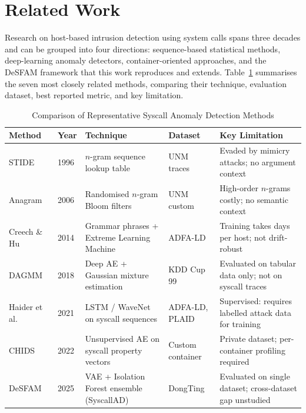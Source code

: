 \section{Related Work}
\label{sec:related}

Research on host-based intrusion detection using system calls spans three decades and can
be grouped into four directions: sequence-based statistical methods, deep-learning anomaly
detectors, container-oriented approaches, and the DeSFAM framework that this work reproduces
and extends. Table~\ref{tab:related_comparison} summarises the seven most closely related
methods, comparing their technique, evaluation dataset, best reported metric, and key
limitation.

\begin{table}[tp]
\centering
\caption{Comparison of Representative Syscall Anomaly Detection Methods}
\label{tab:related_comparison}
\renewcommand{\arraystretch}{1.15}
\begin{tabular}{@{}llllp{4.2cm}@{}}
\toprule
\textbf{Method} & \textbf{Year} & \textbf{Technique} & \textbf{Dataset} & \textbf{Key Limitation} \\
\midrule
STIDE~\cite{forrest1996sense}
  & 1996 & $n$-gram sequence lookup table
  & UNM traces
  & Evaded by mimicry attacks; no argument context \\

Anagram~\cite{wang2006anagram}
  & 2006 & Randomised $n$-gram Bloom filters
  & UNM custom
  & High-order $n$-grams costly; no semantic context \\

Creech \& Hu~\cite{creech2014semantic}
  & 2014 & Grammar phrases + Extreme Learning Machine
  & ADFA-LD
  & Training takes days per host; not drift-robust \\

DAGMM~\cite{zong2018dagmm}
  & 2018 & Deep AE + Gaussian mixture estimation
  & KDD Cup 99
  & Evaluated on tabular data only; not on syscall traces \\

Haider et al.~\cite{haider2021deep}
  & 2021 & LSTM / WaveNet on syscall sequences
  & ADFA-LD, PLAID
  & Supervised: requires labelled attack data for training \\

CHIDS~\cite{elkhairi2022chids}
  & 2022 & Unsupervised AE on syscall property vectors
  & Custom container
  & Private dataset; per-container profiling required \\

DeSFAM~\cite{desfam_original}
  & 2025 & VAE + Isolation Forest ensemble (SyscallAD)
  & DongTing
  & Evaluated on single dataset; cross-dataset gap unstudied \\
\bottomrule
\end{tabular}
\end{table}

